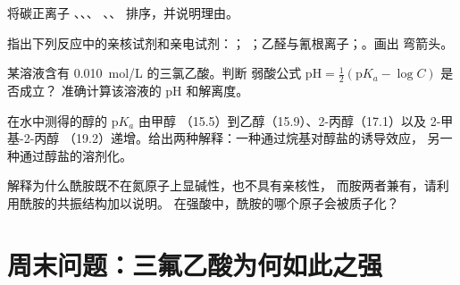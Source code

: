 \begin{exercise}[$\star\star$]\label{exo:b1:electronic-effects:8}
将碳正离子 、、、
、、 排序，并说明理由。
\end{exercise}

\begin{exercise}[$\star\star$]\label{exo:b1:electronic-effects:9}
指出下列反应中的亲核试剂和亲电试剂：；
；乙醛与氰根离子；。画出
弯箭头。
\end{exercise}

\begin{exercise}[$\star\star\star$]\label{exo:b1:electronic-effects:10}
某溶液含有 \qty{0.010}{mol/L} 的三氯乙酸。判断
弱酸公式 $\mathrm{pH} = \frac12(\mathrm{p}K_a - \log C)$ 是否成立？
准确计算该溶液的 pH 和解离度。
\end{exercise}

\begin{exercise}[$\star\star\star$]\label{exo:b1:electronic-effects:11}
在水中测得的醇的 $\mathrm{p}K_a$ 由甲醇
（15.5）到乙醇（15.9）、2-丙醇（17.1）以及 2-甲基-2-丙醇
（19.2）递增。给出两种解释：一种通过烷基对醇盐的诱导效应，
另一种通过醇盐的溶剂化。
\end{exercise}

\begin{exercise}[$\star\star\star$]\label{exo:b1:electronic-effects:12}
解释为什么酰胺既不在氮原子上显碱性，也不具有亲核性，
而胺两者兼有，请利用酰胺的共振结构加以说明。
在强酸中，酰胺的哪个原子会被质子化？
\end{exercise}

\section{周末问题：三氟乙酸为何如此之强}

